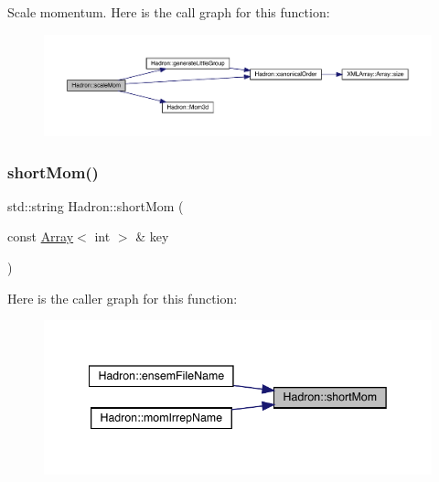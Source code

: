 Scale momentum. Here is the call graph for this function\+:\nopagebreak
\begin{figure}[H]
\begin{center}
\leavevmode
\includegraphics[width=350pt]{d1/daf/namespaceHadron_ab3424b316e2a4d8e820c88f8027742e1_cgraph}
\end{center}
\end{figure}
\mbox{\label{namespaceHadron_aaaec62d26ea28ccc4d611b4797a1d667}} 
\subsubsection{\texorpdfstring{shortMom()}{shortMom()}}
{\footnotesize\ttfamily std\+::string Hadron\+::short\+Mom (\begin{DoxyParamCaption}\item[{const \mbox{\hyperlink{classXMLArray_1_1Array}{Array}}$<$ int $>$ \&}]{key }\end{DoxyParamCaption})}

Here is the caller graph for this function\+:\nopagebreak
\begin{figure}[H]
\begin{center}
\leavevmode
\includegraphics[width=342pt]{d1/daf/namespaceHadron_aaaec62d26ea28ccc4d611b4797a1d667_icgraph}
\end{center}
\end{figure}
\mbox{\label{namespaceHadron_aaa6ace3b1a5c63de278a8bcb9fa80c49}} 
